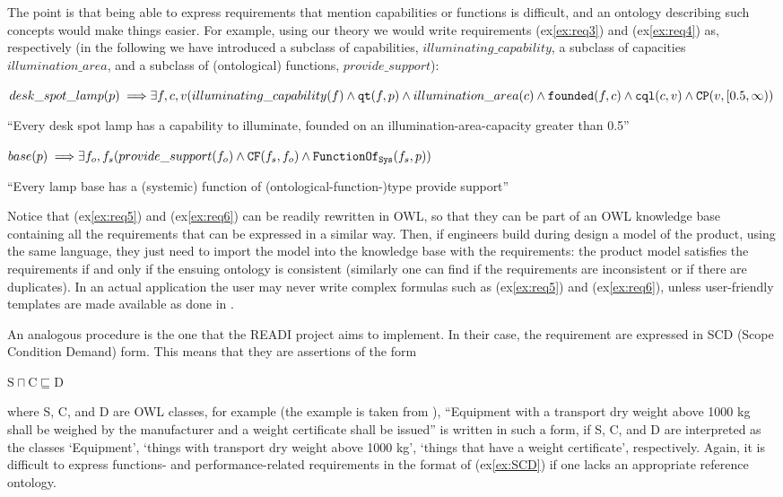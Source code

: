 \documentclass[sw]{iosart2x}
\newcommand{\bflist}{\begin{list}{}{\setlength{\topsep}{2mm}\setlength{\partopsep}{0mm}\setlength{\parsep}{0mm}\setlength{\leftmargin}{9mm}\setlength{\labelwidth}{8mm}}}
\newcommand{\eflist}{\end{list}}
\newcommand{\ExLabel}{\textrm{ex}}
\newcommand{\myex}[1]{\refstepcounter{cntex}\begin{small}{\bf \ExLabel\thecntex\label{ex:#1}}\end{small}}
\newcounter{cntex}
\newcommand{\mytext}[1]{``#1''}
\newcommand{\refex}[1]{({\ExLabel}\ref{#1})}
\newcommand{\generalStyle}[1]{\texttt{#1}}
\newcommand{\biRel}[3]{\generalStyle{#1}(#2,#3)}
\newcommand{\biRelPar}[4]{\generalStyle{#1}_{\generalStyle{#4}}(#2,#3)}
\newcommand{\myfi}{\hspace{0.9mm} \Longrightarrow}
\newcommand{\OWL}{\textnormal{OWL}\xspace}
\newcommand{\DOLCEPartBin}[2]{\biRel{{CP}}{#1}{#2}}
\newcommand{\DOLCEQualityDirect}[2]{\biRel{qt}{#1}{#2}}
\newcommand{\DOLCEQualeDirect}[2]{\biRel{{cql}}{#1}{#2}}
\newcommand{\DOLCECLbyBinary}[2]{\biRel{CF}{#1}{#2}}
\newcommand{\FunctionSysOf}[2]{\biRelPar{FunctionOf}{#1}{#2}{Sys}}
\newcommand{\founded}[2]{\biRel{\foundedTerm{passive}}{#1}{#2}}
\newcommand{\foundedTerm}[1]{%
  \ifthenelse{\equal{#1}{passive}}{founded}{%
    \ifthenelse{\equal{#1}{verb}}{found}{%
      \ifthenelse{\equal{#1}{gerund}}{founding}{%
        ERROR!%
      }%
    }%
  }%
}
\newcommand{\quotes}[1]{`#1'}
\newcommand{\qquotes}[1]{``#1''}
\begin{document}
The point is that being able to express requirements that mention capabilities or functions is difficult, and an ontology describing such concepts would make things easier.
For example, using our theory we would write requirements \refex{ex:req3} and \refex{ex:req4} as, respectively (in the following we have introduced a subclass of capabilities, $illuminating\_capability$, a subclass of capacities $illumination\_area$, and a subclass of (ontological) functions, $provide\_support$):
\bflist
  \item[\myex{req5}] $ desk\_spot\_lamp(p) \myfi \exists f,c,v( illuminating\_capability(f) \land \DOLCEQualityDirect{f}{p} \land illumination\_area(c) \land \\ \founded{f}{c} \land \DOLCEQualeDirect{c}{v} \land \DOLCEPartBin{v}{[0.5, \infty)}$
  \item[] \mytext{Every desk spot lamp has a capability to illuminate, founded on an illumination-area-capacity greater than 0.5} 
  \item[\myex{req6}] $ base(p) \myfi \exists f_o,f_s (provide\_support(f_o) \land \DOLCECLbyBinary{f_s}{f_o} \land \FunctionSysOf{f_s}{p})$
  \item[] \mytext{Every lamp base has a (systemic) function of (ontological-function-)type provide support} 
\eflist
Notice that \refex{ex:req5} and \refex{ex:req6} can be readily rewritten in \OWL, so that they can be part of an \OWL knowledge base containing all the requirements that can be expressed in a similar way. 
Then, if engineers build during design a model of the product, using the same language, they just need to import the model into the knowledge base with the requirements: the product model satisfies the requirements if and only if the ensuing ontology is consistent (similarly one can find if the requirements are inconsistent or if there are duplicates).  
In an actual application the user may never write complex formulas such as \refex{ex:req5} and \refex{ex:req6}, unless user-friendly templates are made available as done in \cite{chenOntologybasedRequirementVerification2020}.  

An analogous procedure is the one that the READI project \cite{overliAssetInformationModelling2021,kluwerOntologybasedRequirementsManagement2018} aims to implement. 
In their case, the requirement are expressed in SCD (Scope Condition Demand) form.
This means that they are assertions of the form
\bflist
  \item[\myex{SCD}] $ \text{S} \sqcap \text{C} \sqsubseteq \text{D}  $
\eflist
where S, C, and D are \OWL classes, for example (the example is taken from \cite{overliAssetInformationModelling2021}), \qquotes{Equipment with a transport dry weight above 1000 kg shall be weighed by the manufacturer and a weight certificate shall be issued} is written in such a form, if S, C, and D are interpreted as the classes \quotes{Equipment}, \quotes{things with transport dry weight above 1000 kg}, \quotes{things that have a weight certificate}, respectively.   
Again, it is difficult to express functions- and performance-related requirements in the format of \refex{ex:SCD} if one lacks an appropriate reference ontology. 
\end{document}

